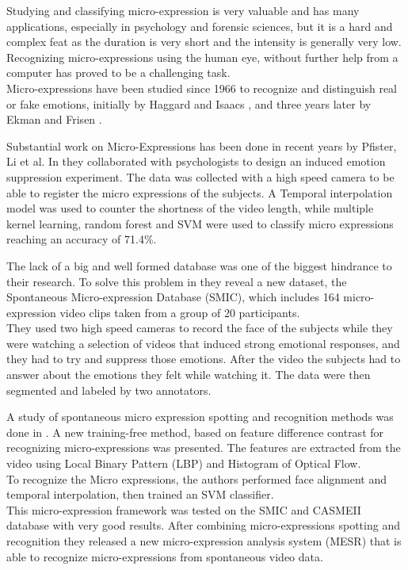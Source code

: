 Studying and classifying micro-expression is very valuable and has many applications, especially in psychology and forensic sciences, but it is a hard and complex feat as the duration is very short and the intensity is generally very low. Recognizing micro-expressions using the human eye, without further help from a computer has proved to be a challenging task.\\ 
Micro-expressions have been studied since 1966 to recognize and distinguish real or fake emotions, initially by Haggard and Isaacs \cite{Haggard}, and three years later by Ekman and Frisen \cite{EkmanLeakage}.

Substantial work on Micro-Expressions has been done in recent years by Pfister, Li et al. In \cite{pfister2011micro} they collaborated with psychologists to design an induced emotion suppression experiment. The data was collected with a high speed camera to be able to register the micro expressions of the subjects. A Temporal interpolation model was used to counter the shortness of the video length, while multiple kernel learning, random forest and SVM were used to classify micro expressions reaching an accuracy of 71.4\%.

The lack of a big and well formed database was one of the biggest hindrance to their research. To solve this problem in \cite{xli2012spontaneous} they reveal a new dataset, the Spontaneous Micro-expression Database (SMIC), which includes 164 micro-expression video clips taken from a group of 20 participants.\\
They used two high speed cameras to record the face of the subjects while they were watching a selection of videos that induced strong emotional responses, and they had to try and suppress those emotions. After the video the subjects had to answer about the emotions they felt while watching it. The data were then segmented and labeled by two annotators.

A study of spontaneous micro expression spotting and recognition methods was done in \cite{xli2015reading}. A new training-free method, based on feature difference contrast for recognizing micro-expressions was presented. The features are extracted from the video using Local Binary Pattern (LBP) and Histogram of Optical Flow. \\
To recognize the Micro expressions, the authors performed face alignment and temporal interpolation, then trained an SVM classifier. \\
This micro-expression framework was tested on the SMIC and CASMEII database with very good results. After combining micro-expressions spotting and recognition they released a new micro-expression analysis system (MESR) that is able to recognize micro-expressions from spontaneous video data.


